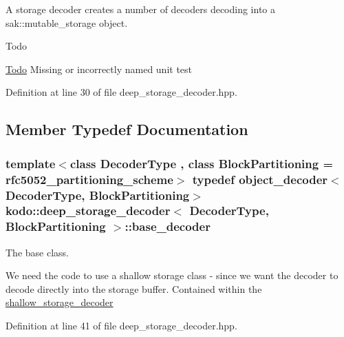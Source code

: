 A storage decoder creates a number of decoders decoding into a sak\-::mutable\-\_\-storage object. 

\begin{DoxyRefDesc}{Todo}
\item[\hyperlink{todo__todo000007}{Todo}]Missing or incorrectly named unit test \end{DoxyRefDesc}


Definition at line 30 of file deep\-\_\-storage\-\_\-decoder.\-hpp.



\subsection{Member Typedef Documentation}
\hypertarget{classkodo_1_1deep__storage__decoder_a0b4631c8de87e9f2a69fae2ef9dd6632}{
\subsubsection[{base\-\_\-decoder}]{\setlength{\rightskip}{0pt plus 5cm}template$<$class Decoder\-Type , class Block\-Partitioning  = rfc5052\-\_\-partitioning\-\_\-scheme$>$ typedef {\bf object\-\_\-decoder}$<$Decoder\-Type, Block\-Partitioning$>$ {\bf kodo\-::deep\-\_\-storage\-\_\-decoder}$<$ Decoder\-Type, Block\-Partitioning $>$\-::{\bf base\-\_\-decoder}}}\label{classkodo_1_1deep__storage__decoder_a0b4631c8de87e9f2a69fae2ef9dd6632}


The base class. 

We need the code to use a shallow storage class -\/ since we want the decoder to decode directly into the storage buffer. Contained within the \hyperlink{classkodo_1_1shallow__storage__decoder}{shallow\-\_\-storage\-\_\-decoder} 

Definition at line 41 of file deep\-\_\-storage\-\_\-decoder.\-hpp.



